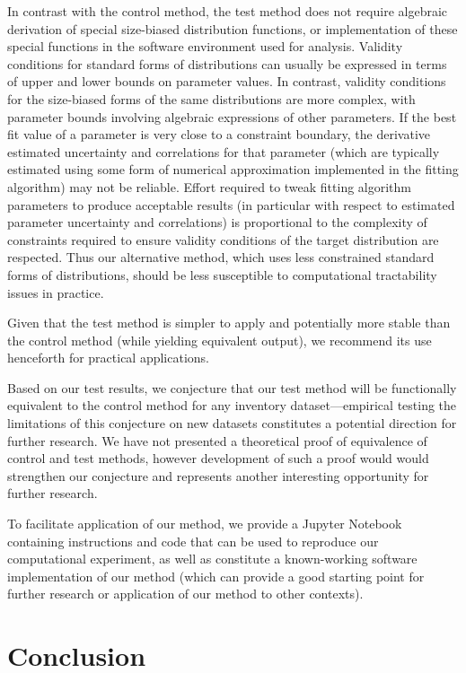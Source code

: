 \message{ !name(hpsdistfit_article.tex)}\documentclass{article}
\begin{document}
In contrast with the control method, the test method does not
require algebraic derivation of special size-biased distribution
functions, or implementation of these special functions in the software environment used
for analysis.
Validity conditions for standard forms of distributions can usually be expressed in terms of upper and lower bounds on parameter values. 
In contrast, validity conditions for the size-biased forms of the same distributions are more complex, with parameter bounds  involving algebraic expressions of other parameters. 
If the best fit value of a parameter is very close to a constraint boundary, the derivative estimated uncertainty and correlations for that parameter (which are typically estimated using some form of numerical approximation implemented in the fitting algorithm) may not be reliable.
Effort required to tweak fitting algorithm parameters to produce acceptable results (in particular with respect to estimated parameter uncertainty and correlations) is proportional to the complexity of constraints required to ensure validity conditions of the target distribution are respected.
Thus our alternative method, which uses less constrained standard
forms of distributions, should be less susceptible to computational
tractability issues in practice.

Given that the test method is simpler to apply and potentially more
stable than the control method (while yielding equivalent output), we recommend its use henceforth
for practical applications.

Based on our test results, we conjecture that our test method will be
functionally equivalent to the control method for any inventory
dataset---empirical testing the limitations of this conjecture on new
datasets constitutes a potential direction for further research.
We have not presented a theoretical proof of equivalence of control
and test methods, however development of such a proof would would
strengthen our conjecture and represents another interesting opportunity for further research.

To facilitate application of our method, we provide a Jupyter Notebook
containing instructions and code that can be used to
reproduce our computational experiment, as well as constitute a
known-working software implementation of our method (which can provide
a good starting point for further research or application of our method to other contexts).

\section{Conclusion}
\label{sec:conclusion}
\end{document}
